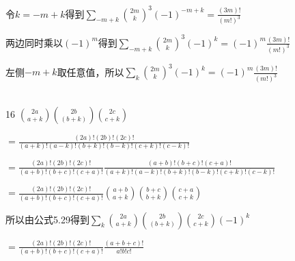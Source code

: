 \documentclass[onecolumn]{article}
\begin{document}
令$k=-m+k$得到$\sum_{-m+k}\binom{2m}{k}^{3}(-1)^{-m+k}=\frac{(3m)!}{(m!)^{3}}$ \par
两边同时乘以$(-1)^{m}$得到$\sum_{-m+k}\binom{2m}{k}^{3}(-1)^{k}=(-1)^{m}\frac{(3m)!}{(m!)^{3}}$ \par
左侧$-m+k$取任意值，所以$\sum_{k}\binom{2m}{k}^{3}(-1)^{k}=(-1)^{m}\frac{(3m)!}{(m!)^{3}}$ \par
~\\
16 $\binom{2a}{a+k}\binom{2b}{(b+k)}\binom{2c}{c+k}$ \par
$=\frac{(2a)!(2b)!(2c)!}{(a+k)!(a-k)!(b+k)!(b-k)!(c+k)!(c-k)!}$ \par
$=\frac{(2a)!(2b)!(2c)!}{(a+b)!(b+c)!(c+a)!}\frac{(a+b)!(b+c)!(c+a)!}{(a+k)!(a-k)!(b+k)!(b-k)!(c+k)!(c-k)!}$ \par
$=\frac{(2a)!(2b)!(2c)!}{(a+b)!(b+c)!(c+a)!}\binom{a+b}{a+k}\binom{b+c}{b+k}\binom{c+a}{c+k}$ \par
所以由公式5.29得到$\sum_{k}\binom{2a}{a+k}\binom{2b}{(b+k)}\binom{2c}{c+k}(-1)^{k}$ \par
$=\frac{(2a)!(2b)!(2c)!}{(a+b)!(b+c)!(c+a)!}\frac{(a+b+c)!}{a!b!c!}$   \par
~\\
\end{document}
